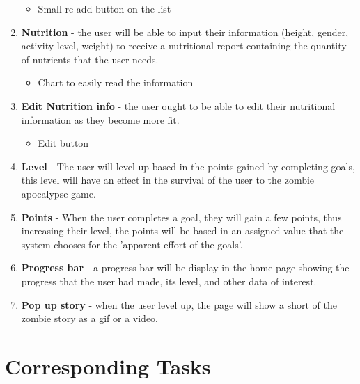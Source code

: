 \documentclass[a4paper]{article}
\begin{document}
\begin{enumerate}
\begin{itemize}
\item Small re-add button on the list
\end{itemize}
\item \textbf{ Nutrition } - the user will be able to input their information (height, gender, activity level, weight) to receive a nutritional report containing the quantity of nutrients that the user needs.
\begin{itemize}
\item Chart to easily read the information
\end{itemize}
\item  \textbf{Edit Nutrition info} - the user ought to be able to edit their nutritional information as they become more fit.
\begin{itemize}
\item Edit button
\end{itemize}
\item \textbf{Level} - The user will level up based in the points gained by completing goals, this level will have an effect in the survival of the user to the zombie apocalypse game.
\item \textbf{Points} - When the user completes a goal, they will gain a few points, thus increasing their level, the points will be based in an assigned value that the system chooses for the 'apparent effort of the goals'.
\item \textbf{Progress bar} - a progress bar will be display in the home page showing the progress that the user had made, its level, and other data of interest.
\item \textbf{Pop up story} - when the user level up, the page will show a short of the zombie story as a gif or a video. 

\end{enumerate}


\section{Corresponding Tasks}
\end{document}
